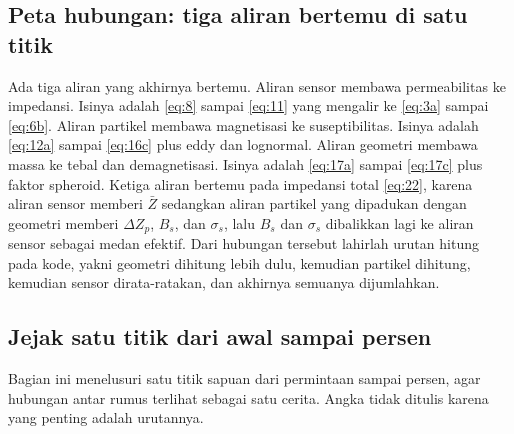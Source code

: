 \documentclass[a4paper,11pt]{article}
\begin{document}
\subsection{Peta hubungan: tiga aliran bertemu di satu titik}
Ada tiga aliran yang akhirnya bertemu.
Aliran sensor membawa permeabilitas ke impedansi.
Isinya adalah \eqref{eq:8} sampai \eqref{eq:11} yang mengalir ke
\eqref{eq:3a} sampai \eqref{eq:6b}.
Aliran partikel membawa magnetisasi ke suseptibilitas.
Isinya adalah \eqref{eq:12a} sampai \eqref{eq:16c} plus eddy dan lognormal.
Aliran geometri membawa massa ke tebal dan demagnetisasi.
Isinya adalah \eqref{eq:17a} sampai \eqref{eq:17c} plus faktor spheroid.
Ketiga aliran bertemu pada impedansi total \eqref{eq:22}, karena aliran
sensor memberi $\bar Z$ sedangkan aliran partikel yang dipadukan dengan
geometri memberi $\Delta Z_{p}$, $B_{s}$, dan $\sigma_{s}$, lalu $B_{s}$ dan
$\sigma_{s}$ dibalikkan lagi ke aliran sensor sebagai medan efektif.
Dari hubungan tersebut lahirlah urutan hitung pada kode, yakni geometri
dihitung lebih dulu, kemudian partikel dihitung, kemudian sensor
dirata-ratakan, dan akhirnya semuanya dijumlahkan.

\subsection{Jejak satu titik dari awal sampai persen}
Bagian ini menelusuri satu titik sapuan dari permintaan sampai persen,
agar hubungan antar rumus terlihat sebagai satu cerita.
Angka tidak ditulis karena yang penting adalah urutannya.
\end{document}
